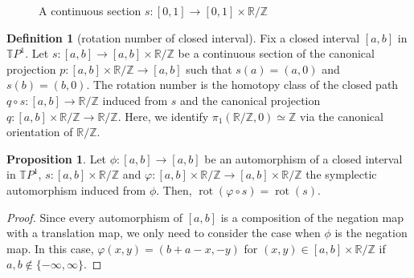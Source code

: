 \documentclass[a4paper,dvipdfmx,reqno,12pt]{amsart}
\theoremstyle{definition}
\newtheorem{definition}[theorem]{Definition}
\newtheorem{proposition}[theorem]{Proposition}
\newcommand{\opn}[1]{\operatorname{#1}}
\numberwithin{equation}{section}
\begin{document}
\begin{figure}
  \centering

\caption{A continuous section $s\colon [0,1]\to [0,1]\times \mathbb{R}/\mathbb{Z}$}
\end{figure}

\begin{definition}[{rotation number of closed interval}]
Fix a closed interval $[a,b]$ in $\mathbb{T}P^{1}$.
Let $s\colon [a,b]\to [a,b]\times \mathbb{R}/\mathbb{Z}$ be 
a continuous section of the canonical projection
$p\colon [a,b]\times \mathbb{R}/\mathbb{Z} \to [a,b]$
such that $s(a)=(a,0)$ and $s(b)=(b,0)$. 
The rotation number
is the homotopy class of the closed path
$q\circ s\colon [a,b]\to \mathbb{R}/\mathbb{Z}$
induced from $s$ and the canonical projection
$q\colon [a,b]\times \mathbb{R}/\mathbb{Z} 
\to \mathbb{R}/\mathbb{Z}$. Here, 
we identify $\pi_1(\mathbb{R}/\mathbb{Z},0)\simeq \mathbb{Z}$
via the canonical orientation of $\mathbb{R}/\mathbb{Z}$.
\end{definition}

\begin{proposition} \label{proposition-rotation-number}
Let 
$\phi \colon [a,b] \to [a,b]$ be an automorphism of 
a closed interval in $\mathbb{T}P^{1}$, 
$s\colon [a,b]\times \mathbb{R}/\mathbb{Z}$ and 
$\varphi \colon [a,b]\times \mathbb{R}/\mathbb{Z} \to 
[a,b]\times \mathbb{R}/\mathbb{Z}$ 
the symplectic automorphism induced from $\phi$.
Then, $\opn{rot}(\varphi\circ s)=\opn{rot}(s)$.
\end{proposition}
\begin{proof}
Since every automorphism of 
$[a,b]$ is a composition of the negation map 
with a translation map, we only need to consider the case
when $\phi$ is the negation map.
In this case, $\varphi(x,y)=(b+a-x,-y)$ for 
$(x,y)\in [a,b]\times \mathbb{R}/\mathbb{Z}$ if 
$a,b\notin \{-\infty,\infty\}$.
\end{proof}
\end{document}
